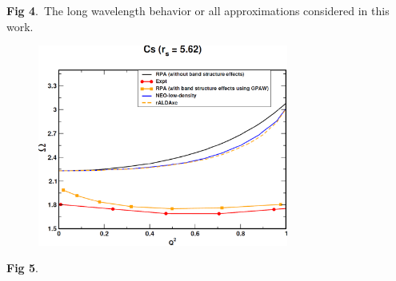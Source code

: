 \documentclass[12pt]{article}
\renewcommand{\_}{\kern-1.5pt\textunderscore\kern-1.5pt}
\begin{document}

\setlength{\parskip}{0.0pt}
\par


\vspace{\baselineskip}
\setlength{\parskip}{9.96pt}

\vspace{\baselineskip}
\setlength{\parskip}{0.0pt}
\setlength{\parskip}{9.96pt}
\setlength{\parskip}{0.0pt}
\begin{justify}
\textbf{Fig 4}.\  The long wavelength behavior or all approximations considered in this work.
\end{justify}\par


\vspace{\baselineskip}
\setlength{\parskip}{9.96pt}

\vspace{\baselineskip}
\setlength{\parskip}{0.0pt}
\setlength{\parskip}{9.96pt}



\begin{figure}[H]
	\begin{Center}
		\includegraphics[width=3.24in,height=2.61in]{./media/image1.png}
	\end{Center}
\end{figure}



\setlength{\parskip}{0.0pt}
\par


\vspace{\baselineskip}
\setlength{\parskip}{9.96pt}
\setlength{\parskip}{0.0pt}
\begin{justify}
\textbf{Fig 5}.\  
\end{justify}\par
\end{document}

